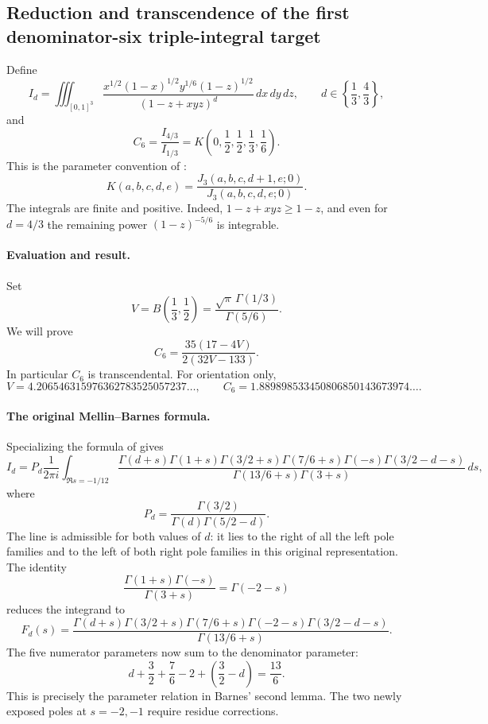 \documentclass[11pt,a4paper]{article}
\theoremstyle{definition}
\theoremstyle{remark}
\numberwithin{equation}{section}
\begin{document}
\subsection{Reduction and transcendence of the first denominator-six triple-integral target}
\label{extra8-sec:triple6a}

Define
\[
 I_d=\iiint_{[0,1]^3}
 \frac{x^{1/2}(1-x)^{1/2}y^{1/6}(1-z)^{1/2}}
 {(1-z+xyz)^d}\,dx\,dy\,dz,
 \qquad d\in\left\{\frac13,\frac43\right\},
\]
and
\[
 C_6=\frac{I_{4/3}}{I_{1/3}}
 =K\left(0,\frac12,\frac12,\frac13,\frac16\right).
\]
This is the parameter convention of \cite{extra8-zudilin}:
\[
 K(a,b,c,d,e)=\frac{J_3(a,b,c,d+1,e;0)}{J_3(a,b,c,d,e;0)}.
\]
The integrals are finite and positive. Indeed,
$1-z+xyz\geq1-z$, and even for $d=4/3$ the remaining power
$(1-z)^{-5/6}$ is integrable.

\paragraph{Evaluation and result.}
Set
\[
 V=B\left(\frac13,\frac12\right)
 =\frac{\sqrt\pi\,\Gamma(1/3)}{\Gamma(5/6)}.
\]
We will prove
\begin{equation}
 \boxed{C_6=\frac{35(17-4V)}{2(32V-133)}.}
 \label{extra8-eq:triple6a-main}
\end{equation}
In particular $C_6$ is transcendental. For orientation only,
\[
 V=4.206546315976362783525057237\ldots,
 \qquad C_6=1.889898533450806850143673974\ldots.
\]

\paragraph{The original Mellin--Barnes formula.}
Specializing the formula of \cite{extra8-zudilin} gives
\[
 I_d=P_d\frac1{2\pi i}\int_{\Re s=-1/12}
 \frac{\Gamma(d+s)\Gamma(1+s)\Gamma(3/2+s)
 \Gamma(7/6+s)\Gamma(-s)\Gamma(3/2-d-s)}
 {\Gamma(13/6+s)\Gamma(3+s)}\,ds,
\]
where
\[
 P_d=\frac{\Gamma(3/2)}{\Gamma(d)\Gamma(5/2-d)}.
\]
The line is admissible for both values of $d$: it lies to the right
of all the left pole families and to the left of both right pole
families in this original representation. The identity
\[
 \frac{\Gamma(1+s)\Gamma(-s)}{\Gamma(3+s)}=\Gamma(-2-s)
\]
reduces the integrand to
\[
 F_d(s)=\frac{\Gamma(d+s)\Gamma(3/2+s)\Gamma(7/6+s)
 \Gamma(-2-s)\Gamma(3/2-d-s)}{\Gamma(13/6+s)}.
\]
The five numerator parameters now sum to the denominator parameter:
\[
 d+\frac32+\frac76-2+\left(\frac32-d\right)=\frac{13}6.
\]
This is precisely the parameter relation in Barnes' second lemma.
The two newly exposed poles at $s=-2,-1$ require residue corrections.
\end{document}
